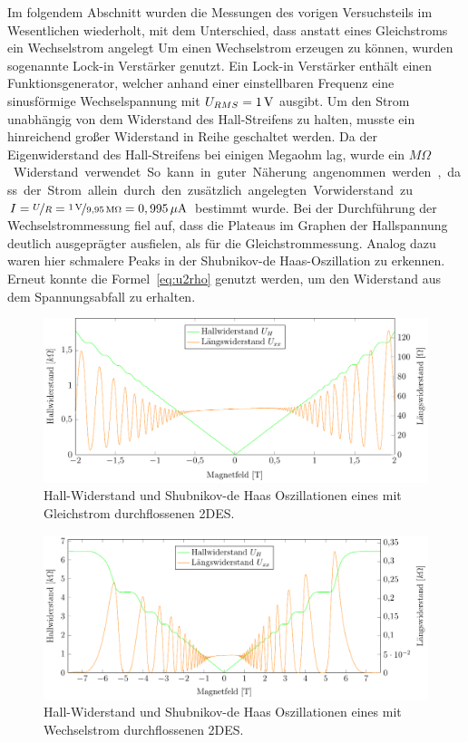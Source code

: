 
Im folgendem Abschnitt wurden die Messungen des vorigen Versuchsteils im Wesentlichen wiederholt, mit dem Unterschied, dass anstatt eines Gleichstroms ein Wechselstrom angelegt %
 Um einen Wechselstrom erzeugen zu können, wurden sogenannte Lock-in Verstärker genutzt. Ein Lock-in Verstärker enthält einen Funktionsgenerator, welcher anhand einer einstellbaren Frequenz eine sinusförmige Wechselspannung mit $U_{RMS}=\unit[1]{V}$ ausgibt. Um den Strom unabhängig von dem Widerstand des Hall-Streifens zu halten, musste ein hinreichend großer Widerstand in Reihe geschaltet werden. Da der Eigenwiderstand des Hall-Streifens bei einigen Megaohm lag, wurde ein  \unit[9,95]{$M\Omega$} Widerstand verwendet. So kann in guter Näherung angenommen werden, dass der Strom allein durch den zusätzlich angelegten Vorwiderstand zu $I=\nicefrac{U}{R}=\nicefrac{\unit[1]{V}}{\unit[9,95]{M\Omega}}=\unit[0,995]{\mu A}$ bestimmt wurde. 
 Bei der Durchführung der Wechselstrommessung fiel auf, dass die Plateaus im Graphen der Hallspannung %
 deutlich ausgeprägter ausfielen, als für die Gleichstrommessung. Analog dazu waren hier schmalere Peaks in der Shubnikov-de Haas-Oszillation zu erkennen.  
 Erneut konnte die Formel~\eqref{eq:u2rho} genutzt werden, um den Widerstand aus dem Spannungsabfall zu erhalten. %

\begin{figure}[h]
	\centering
	\includegraphics{graphs/ac/pm2T_range.pdf}
	\caption[Höher aufgelöste Gleichstrommessung in Magnetfeldteilbereich]{
		Hall-Widerstand und Shubnikov-de Haas Oszillationen eines mit Gleichstrom durchflossenen 2DES.
	}
	\label{fig:2T_range_ac}
\end{figure}


\begin{figure}[h]
	\centering
	\includegraphics{graphs/ac/full_range.pdf}
	\caption[Wechselstrommessung im maximalen Magnetfeldbereich]{
		Hall-Widerstand und Shubnikov-de Haas Oszillationen eines mit Wechselstrom durchflossenen 2DES.
	}
	\label{fig:full_range_ac}
\end{figure}


